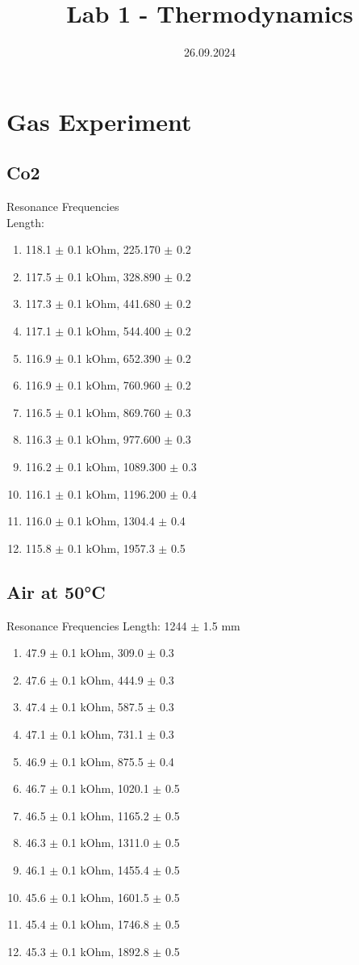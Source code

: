 \documentclass[]{scrartcl}
\title{Lab 1 - Thermodynamics}
\author{}
\date{26.09.2024}
\begin{document}
\maketitle
\newpage
\tableofcontents
\newpage

\section{Gas Experiment}


\subsection{Co2}
Resonance Frequencies\\
Length: 
\begin{enumerate}
	\item 118.1 $\pm$ 0.1 kOhm, 225.170 $\pm$ 0.2
	\item 117.5 $\pm$ 0.1 kOhm, 328.890 $\pm$ 0.2
	\item 117.3 $\pm$ 0.1 kOhm, 441.680 $\pm$ 0.2
	\item 117.1 $\pm$ 0.1 kOhm, 544.400 $\pm$ 0.2
	\item 116.9 $\pm$ 0.1 kOhm, 652.390 $\pm$ 0.2
	\item 116.9 $\pm$ 0.1 kOhm, 760.960 $\pm$ 0.2
	\item 116.5 $\pm$ 0.1 kOhm, 869.760 $\pm$ 0.3
	\item 116.3 $\pm$ 0.1 kOhm, 977.600 $\pm$ 0.3
	\item 116.2 $\pm$ 0.1 kOhm, 1089.300 $\pm$ 0.3
	\item 116.1 $\pm$ 0.1 kOhm, 1196.200 $\pm$ 0.4
	\item 116.0 $\pm$ 0.1 kOhm, 1304.4 $\pm$ 0.4
	\item 115.8 $\pm$ 0.1 kOhm, 1957.3 $\pm$ 0.5
\end{enumerate}

\subsection{Air at 50°C}
Resonance Frequencies
Length: 1244 $\pm$ 1.5 mm
\begin{enumerate}
	\item 47.9 $\pm$ 0.1 kOhm, 309.0 $\pm$ 0.3
	\item 47.6 $\pm$ 0.1 kOhm, 444.9 $\pm$ 0.3
	\item 47.4 $\pm$ 0.1 kOhm, 587.5 $\pm$ 0.3
	\item 47.1 $\pm$ 0.1 kOhm, 731.1 $\pm$ 0.3
	\item 46.9 $\pm$ 0.1 kOhm, 875.5 $\pm$ 0.4
	\item 46.7 $\pm$ 0.1 kOhm, 1020.1 $\pm$ 0.5
	\item 46.5 $\pm$ 0.1 kOhm, 1165.2 $\pm$ 0.5
	\item 46.3 $\pm$ 0.1 kOhm, 1311.0 $\pm$ 0.5
	\item 46.1 $\pm$ 0.1 kOhm, 1455.4 $\pm$ 0.5
	\item 45.6 $\pm$ 0.1 kOhm, 1601.5 $\pm$ 0.5
	\item 45.4 $\pm$ 0.1 kOhm, 1746.8 $\pm$ 0.5
	\item 45.3 $\pm$ 0.1 kOhm, 1892.8 $\pm$ 0.5
\end{enumerate}
\end{document}
